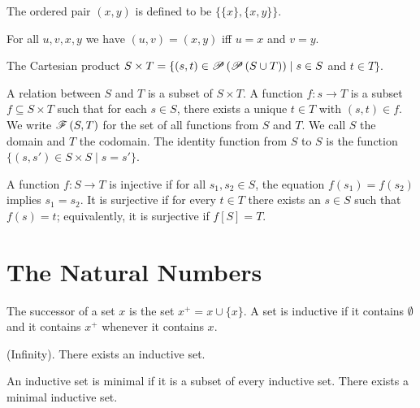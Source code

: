 \documentclass{report}
\begin{document}
\begin{definition}
  The ordered pair $\left( x,y \right)$ is defined to be $\{\{x\},\{x,y\}\}$.
\end{definition}

\begin{lemma}
  For all $u,v,x,y$ we have $(u,v) = (x,y)$ iff $u=x$ and $v=y$.
\end{lemma}

\begin{definition}
  The Cartesian product $S \times T = \{ (s,t) \in \mathscr{P} \left( \mathscr{P} \left( S \cup T \right) \right) \mid s \in S$ and $t \in T \}$.
\end{definition}

\begin{definition}
  A relation between $S$ and $T$ is a subset of $S \times T$. A function $f:s \rightarrow T$ is a subset $f \subseteq S \times T$ such that for each $s \in S$, there exists a unique $t \in T$ with $(s,t) \in f$. We write $\mathscr{F} \left( S,T \right)$ for the set of all functions from $S$ and $T$. We call $S$ the domain and $T$ the codomain. The identity function from $S$ to $S$ is the function $\{\left( s,s' \right) \in S \times S \mid s = s' \}$.
\end{definition}

\begin{definition}
  A function $f:S \rightarrow T$ is injective if for all $s_1,s_2 \in S$, the equation $f(s_1) = f(s_2)$ implies $s_1 = s_2$. It is surjective if for every $t \in T$ there exists an $s \in S$ such that $f(s) = t$; equivalently, it is surjective if $f[S] = T$.
\end{definition}

\newpage
\section{The Natural Numbers}
\begin{definition} 
  The successor of a set $x$ is the set $x^+ = x \cup \{x\}$. A set is inductive if it contains $\emptyset$ and it contains $x^+$ whenever it contains $x$.
\end{definition}

\begin{axiom}
  {\normalfont (Infinity).} There exists an inductive set.
\end{axiom}

\begin{theorem}
  An inductive set is minimal if it is a subset of every inductive set. There exists a minimal inductive set.
\end{theorem}
\end{document}
